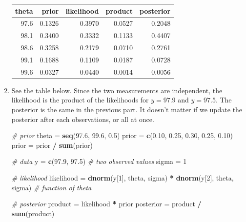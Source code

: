 \documentclass[
]{book}
\newenvironment{Shaded}{\begin{snugshade}}{\end{snugshade}}
\newcommand{\CommentTok}[1]{\textcolor[rgb]{0.56,0.35,0.01}{\textit{#1}}}
\newcommand{\DecValTok}[1]{\textcolor[rgb]{0.00,0.00,0.81}{#1}}
\newcommand{\FloatTok}[1]{\textcolor[rgb]{0.00,0.00,0.81}{#1}}
\newcommand{\KeywordTok}[1]{\textcolor[rgb]{0.13,0.29,0.53}{\textbf{#1}}}
\newcommand{\NormalTok}[1]{#1}
\newcommand{\OperatorTok}[1]{\textcolor[rgb]{0.81,0.36,0.00}{\textbf{#1}}}
\newcommand{\StringTok}[1]{\textcolor[rgb]{0.31,0.60,0.02}{#1}}
\theoremstyle{definition}
\theoremstyle{definition}
\theoremstyle{definition}
\theoremstyle{remark}
\begin{document}
\begin{enumerate}
  \begin{tabular}{r|r|r|r|r}
   \hline
   theta & prior & likelihood & product & posterior\\
   \hline
   97.6 & 0.1326 & 0.3970 & 0.0527 & 0.2048\\
   \hline
   98.1 & 0.3400 & 0.3332 & 0.1133 & 0.4407\\
   \hline
   98.6 & 0.3258 & 0.2179 & 0.0710 & 0.2761\\
   \hline
   99.1 & 0.1688 & 0.1109 & 0.0187 & 0.0728\\
   \hline
   99.6 & 0.0327 & 0.0440 & 0.0014 & 0.0056\\
   \hline
   \end{tabular}
\item
  See the table below.
  Since the two measurements are independent, the likelihood is the product of the likelihoods for \(y=97.9\) and \(y=97.5\).
  The posterior is the same in the previous part. It doesn't matter if we update the posterior after each observations, or all at once.

\begin{Shaded}
\begin{Highlighting}[]
\CommentTok{\# prior}
\NormalTok{theta =}\StringTok{ }\KeywordTok{seq}\NormalTok{(}\FloatTok{97.6}\NormalTok{, }\FloatTok{99.6}\NormalTok{, }\FloatTok{0.5}\NormalTok{)}
\NormalTok{prior =}\StringTok{ }\KeywordTok{c}\NormalTok{(}\FloatTok{0.10}\NormalTok{, }\FloatTok{0.25}\NormalTok{, }\FloatTok{0.30}\NormalTok{, }\FloatTok{0.25}\NormalTok{, }\FloatTok{0.10}\NormalTok{)}
\NormalTok{prior =}\StringTok{ }\NormalTok{prior }\OperatorTok{/}\StringTok{ }\KeywordTok{sum}\NormalTok{(prior)}

\CommentTok{\# data}
\NormalTok{y =}\StringTok{ }\KeywordTok{c}\NormalTok{(}\FloatTok{97.9}\NormalTok{, }\FloatTok{97.5}\NormalTok{) }\CommentTok{\# two observed values}
\NormalTok{sigma =}\StringTok{ }\DecValTok{1}


\CommentTok{\# likelihood}
\NormalTok{likelihood =}\StringTok{ }\KeywordTok{dnorm}\NormalTok{(y[}\DecValTok{1}\NormalTok{], theta, sigma) }\OperatorTok{*}\StringTok{ }\KeywordTok{dnorm}\NormalTok{(y[}\DecValTok{2}\NormalTok{], theta, sigma)  }\CommentTok{\# function of theta}

\CommentTok{\# posterior}
\NormalTok{product =}\StringTok{ }\NormalTok{likelihood }\OperatorTok{*}\StringTok{ }\NormalTok{prior}
\NormalTok{posterior =}\StringTok{ }\NormalTok{product }\OperatorTok{/}\StringTok{ }\KeywordTok{sum}\NormalTok{(product)}


\end{Highlighting}
\end{Shaded}
\end{enumerate}
\end{document}
